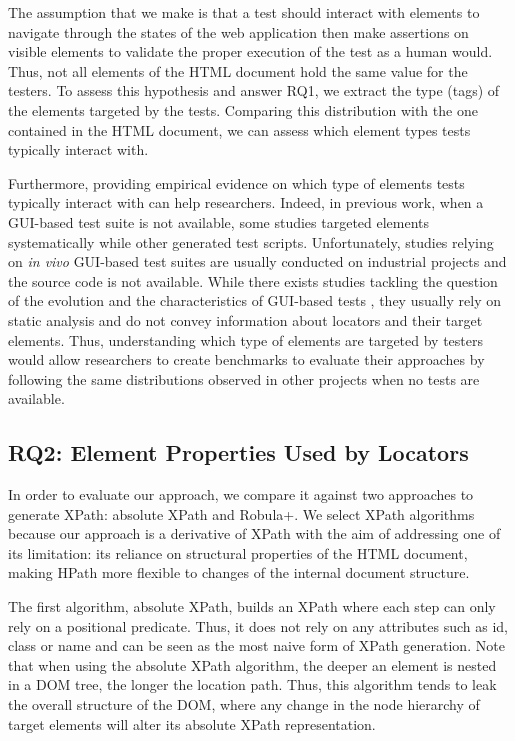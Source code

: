 The assumption that we make is that a test should interact with elements to navigate through the states of the web application then make assertions on visible elements to validate the proper execution of the test as a human would. Thus, not all elements of the HTML document hold the same value for the testers. To assess this hypothesis and answer RQ1, we extract the type (tags) of the elements targeted by the tests. Comparing this distribution with the one contained in the HTML document, we can assess which element types tests typically interact with. 

Furthermore, providing empirical evidence on which type of elements tests typically interact with can help researchers. Indeed, in previous work, when a GUI-based test suite is not available, some studies targeted elements systematically\cite{Cohen2015, Leotta2015, Aldalur2017, Eladawy2018} while other generated test scripts\cite{Grechanik2009, Montoto2011, Kirinuki2019}. Unfortunately, studies relying on \emph{in vivo} GUI-based test suites are usually conducted on industrial projects and the source code is not available\cite{Thummalapenta2013, Yandrapally2014}. While there exists studies tackling the question of the evolution and the characteristics of GUI-based tests \cite{Christophe2014, Rwemalika2019}, they usually rely on static analysis and do not convey information about locators and their target elements. Thus, understanding which type of elements are targeted by testers would allow researchers to create benchmarks to evaluate their approaches by following the same distributions observed in other projects when no tests are available.

\subsection{RQ2: Element Properties Used by Locators}
\label{sec:hpath-protocol-rq2}

In order to evaluate our approach, we compare it against two approaches to generate XPath: absolute XPath and Robula+. We select XPath algorithms because our approach is a derivative of XPath with the aim of addressing one of its limitation: its reliance on structural properties of the HTML document, making HPath more flexible to changes of the internal document structure.

The first algorithm, absolute XPath, builds an XPath where each step can only rely on a positional predicate. Thus, it does not rely on any attributes such as id, class or name and can be seen as the most naive form of XPath generation. Note that when using the absolute XPath algorithm, the deeper an element is nested in a DOM tree, the longer the location path. Thus, this algorithm tends to leak the overall structure of the DOM, where any change in the node hierarchy of target elements will alter its absolute XPath representation.

